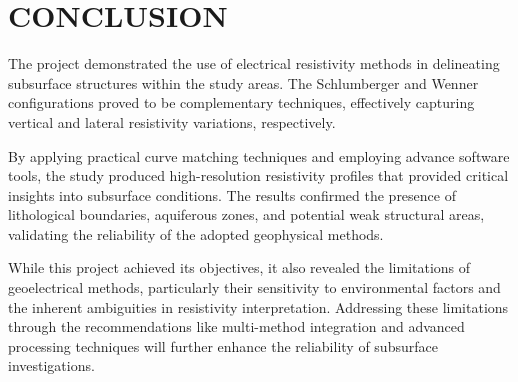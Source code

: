 \documentclass[12pt,a4paper]{report}
\begin{document}
\section{CONCLUSION}

The project demonstrated the use of electrical resistivity methods in delineating subsurface structures within the study areas. The Schlumberger and Wenner configurations proved to be complementary techniques, effectively capturing vertical and lateral resistivity variations, respectively.

By applying practical curve matching techniques and employing advance software tools, the study produced high-resolution resistivity profiles that provided critical insights into subsurface conditions. The results confirmed the presence of lithological boundaries, aquiferous zones, and potential weak structural areas, validating the reliability of the adopted geophysical methods.

While this project achieved its objectives, it also revealed the limitations of geoelectrical methods, particularly their sensitivity to environmental factors and the inherent ambiguities in resistivity interpretation. Addressing these limitations through the recommendations like multi-method integration and advanced processing techniques will further enhance the reliability of subsurface investigations.
\end{document}
